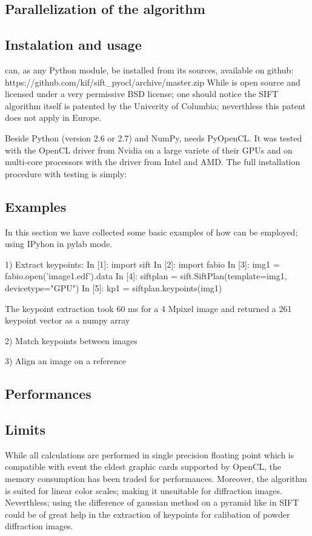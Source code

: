 \documentclass[preprint]{iucr}
\begin{document}
\subsection{Parallelization of the algorithm}

\subsection{Instalation and usage}
 can, as any Python module, be installed from its sources,
available on github:
https://github.com/kif/sift_pyocl/archive/master.zip 
While  is open source and licensed under a very
permissive BSD license; one should notice the SIFT algorithm itself is
patented by the Univerity of Columbia\cite{SIFT}; neverthless this patent does
not apply in Europe.

Beside Python (version 2.6 or 2.7) and NumPy,  needs
PyOpenCL\cite{pyopencl}.
It was tested with the OpenCL\cite{opencl} driver from Nvidia on a
large variete of their GPUs and on multi-core processors with the driver from
Intel and AMD. The full installation procedure with testing is simply:


\subsection{Examples}

In this section we have collected some basic examples of how
 can be employed; using IPyhon\cite{ipython} in
pylab\cite{matplotlib} mode.

1) Extract keypoints:
In [1]: import sift
In [2]: import fabio 
In [3]: img1 = fabio.open('image1.edf').data
In [4]: siftplan = sift.SiftPlan(template=img1, devicetype="GPU")
In [5]: kp1 = siftplan.keypoints(img1)

The keypoint extraction took 60 ms for a 4 Mpixel image and returned a 261
keypoint vector as a numpy array

2) Match keypoints between images



3) Align an image on a reference

   

\subsection{Performances}

\subsection{Limits}
While all calculations are performed in single precision floating point which is
compatible with event the eldest graphic cards supported by OpenCL, the memory
consumption has been traded for performances. Moreover, the algorithm is suited
for linear color scales; making it unsuitable for diffraction images.
Neverthless; using the difference of gaussian method on a pyramid like in
SIFT could be of great help in the extraction of keypoints for calibation of
powder diffraction images.
\end{document}
